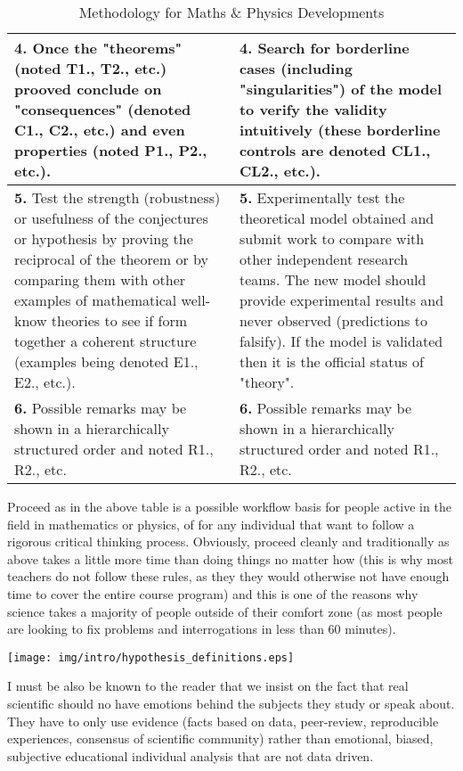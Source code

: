 \begin{table}[H]
\begin{center}
\begin{tabular}{|p{7.5cm}|p{7.5cm}|}
				\textbf{4.} Once the "theorems" (noted T1., T2., etc.) prooved conclude on "consequences" (denoted C1., C2., etc.) and even properties (noted P1., P2., etc.). & \textbf{4.} Search for borderline cases (including "singularities") of the model to verify the validity intuitively (these borderline controls are denoted CL1., CL2., etc.).\\ \hline
				\textbf{5.} Test the strength (robustness) or usefulness of the conjectures or hypothesis by proving the reciprocal of the theorem or by comparing them with other examples of mathematical well-know theories to see if form together a coherent structure (examples being denoted E1., E2., etc.). & \textbf{5.} Experimentally test the theoretical model obtained and submit work to compare with other independent research teams. The new model should provide experimental results and never observed (predictions to falsify). If the model is validated then it is the official status of "theory".\\ \hline
				\textbf{6.} Possible remarks may be shown in a hierarchically structured order and noted R1., R2., etc. & \textbf{6.} Possible remarks may be shown in a hierarchically structured order and noted R1., R2., etc.			
				\\ \hline
		\end{tabular}
	\end{center}
	\caption{Methodology for Maths \& Physics Developments}
	\end{table}	
	
Proceed as in the above table is a possible workflow basis for people active in the field in mathematics or physics, of for any individual that want to follow a rigorous critical thinking process. Obviously, proceed cleanly and traditionally as above takes a little more time than doing things no matter how (this is why most teachers do not follow these rules, as they they would otherwise not have enough time to cover the entire course program) and this is one of the reasons why science takes a  majority of people outside of their comfort zone (as most people are looking to fix problems and interrogations in less than $60$ minutes).

\begin{center}
\texttt{[image: img/intro/hypothesis\_definitions.eps]}
\end{center}
I must be also be known to the reader that we insist on the fact that real scientific should no have emotions behind the subjects they study or speak about. They have to only use evidence (facts based on data, peer-review, reproducible experiences, consensus of scientific community) rather than emotional, biased, subjective educational individual analysis that are not data driven.

